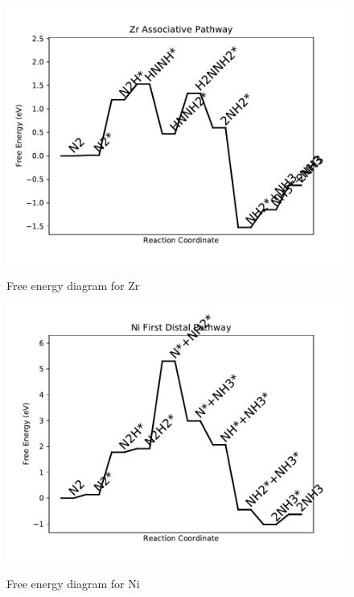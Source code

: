 \documentclass{article}
\begin{document}
\newpage
\begin{figure}
\includegraphics[width=1\linewidth]{data/plots/Zr_associative.pdf}
\label{fig:Zr_associative}
\caption{Free energy diagram for Zr}
\end{figure}

\begin{figure}
\includegraphics[width=1\linewidth]{data/plots/Ni_distal_1.pdf}
\label{fig:Ni_distal_1}
\caption{Free energy diagram for Ni}
\end{figure}
\end{document}
